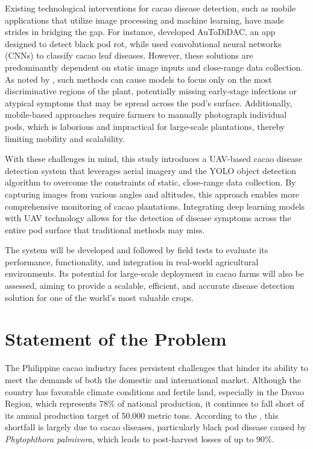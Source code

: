 {Existing technological interventions for cacao disease detection, such as mobile applications that utilize image processing and machine learning, have made strides in bridging the gap. For instance, \cite{Tan2018} developed AuToDiDAC, an app designed to detect black pod rot, while \cite{Tovurawa2025} used convolutional neural networks (CNNs) to classify cacao leaf diseases. However, these solutions are predominantly dependent on static image inputs and close-range data collection. As noted by \cite{Taesiri2023}, such methods can cause models to focus only on the most discriminative regions of the plant, potentially missing early-stage infections or atypical symptoms that may be spread across the pod’s surface. Additionally, mobile-based approaches require farmers to manually photograph individual pods, which is laborious and impractical for large-scale plantations, thereby limiting mobility and scalability.

With these challenges in mind, this study introduces a UAV-based cacao disease detection system that leverages aerial imagery and the YOLO object detection algorithm to overcome the constraints of static, close-range data collection. By capturing images from various angles and altitudes, this approach enables more comprehensive monitoring of cacao plantations. Integrating deep learning models with UAV technology allows for the detection of disease symptoms across the entire pod surface that traditional methods may miss.

The system will be developed and followed by field tests to evaluate its performance, functionality, and integration in real-world agricultural environments. Its potential for large-scale deployment in cacao farms will also be assessed, aiming to provide a scalable, efficient, and accurate disease detection solution for one of the world’s most valuable crops.

\section{Statement of the Problem}

The Philippine cacao industry faces persistent challenges that hinder its ability to meet the demands of both the domestic and international market. Although the country has favorable climate conditions and fertile land, especially in the Davao Region, which represents 78\% of national production, it continues to fall short of its annual production target of 50,000 metric tons. According to the \cite{PhilCacaoRoadmap2021}, this shortfall is largely due to cacao diseases, particularly black pod disease caused by \textit{Phytophthora palmivora}, which leads to post-harvest losses of up to 90\%.  

}
